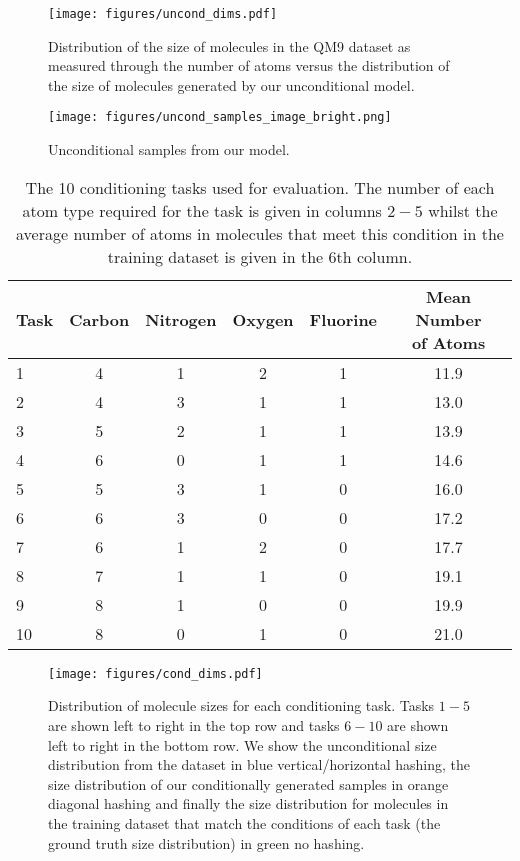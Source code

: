 \begin{figure}
    \centering
    \texttt{[image: figures/uncond\_dims.pdf]}
    \caption{Distribution of the size of molecules in the QM9 dataset as measured through the number of atoms versus the distribution of the size of molecules generated by our unconditional model.}
    \label{fig:uncond_dims}
\end{figure}

\begin{figure}
    \centering
    \texttt{[image: figures/uncond\_samples\_image\_bright.png]}
    \caption{Unconditional samples from our model.}
    \label{fig:apdxUncondMolSamples}
\end{figure}

\begin{table}[h]
     \centering
   \caption{The 10 conditioning tasks used for evaluation. The number of each atom type required for the task is given in columns $2-5$ whilst the average number of atoms in molecules that meet this condition in the training dataset is given in the $6$th column.}
   \begin{tabular}{@{}lccccc@{}}
     \toprule
     Task & Carbon & Nitrogen & Oxygen & Fluorine & \shortstack{Mean Number \\ of Atoms} \\ \midrule
     1 & 4 & 1 & 2 & 1 & 11.9 \\
     2 & 4 & 3 & 1 & 1 & 13.0 \\
     3 & 5 & 2 & 1 & 1 & 13.9 \\
     4 & 6 & 0 & 1 & 1 & 14.6\\
     5 & 5 & 3 & 1 & 0 & 16.0\\
     6 & 6 & 3 & 0 & 0 & 17.2\\
     7 & 6 & 1 & 2 & 0 & 17.7\\
     8 & 7 & 1 & 1 & 0 & 19.1\\
     9 & 8 & 1 & 0 & 0 & 19.9\\
     10 & 8 & 0 & 1 & 0 & 21.0\\ \bottomrule
   \end{tabular}
   \label{tab:molecule_conditions}
\end{table}

\begin{figure}
    \centering
    \texttt{[image: figures/cond\_dims.pdf]}
    \caption{Distribution of molecule sizes for each conditioning task. Tasks $1-5$ are shown left to right in the top row and tasks $6-10$ are shown left to right in the bottom row. We show the unconditional size distribution from the dataset in blue vertical/horizontal hashing, the size distribution of our conditionally generated samples in orange diagonal hashing and finally the size distribution for molecules in the training dataset that match the conditions of each task (the ground truth size distribution) in green no hashing.}
    \label{fig:apdx_CondDims}
\end{figure}



